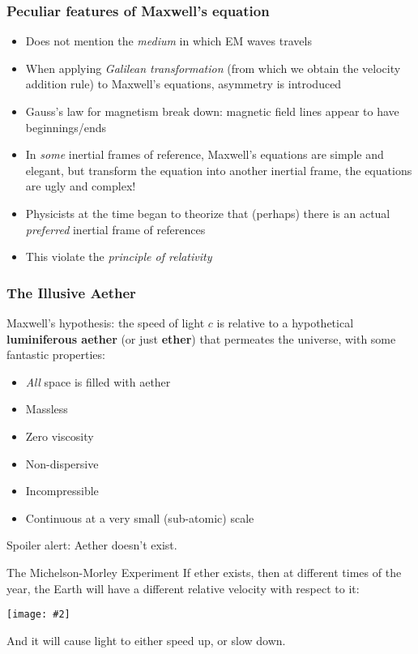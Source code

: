 \documentclass[12pt,compress,aspectratio=169]{beamer}
\newcommand{\pic}[2]{\texttt{[image: \#2]}}
\begin{document}
\begin{frame}
  \frametitle{Peculiar features of Maxwell's equation}
  \begin{itemize}
  \item Does not mention the \emph{medium} in which EM waves travels
  \item When applying \emph{Galilean transformation} (from which we obtain
    the velocity addition rule) to Maxwell's equations, asymmetry is introduced
  \item Gauss's law for magnetism break down: magnetic field lines appear to
    have beginnings/ends
  \item In \emph{some} inertial frames of reference, Maxwell's equations are
    simple and elegant, but transform the equation into another inertial frame,
    the equations are ugly and complex!
  \item Physicists at the time began to theorize that (perhaps) there is an
    actual \emph{preferred} inertial frame of references
  \item This violate the \emph{principle of relativity}
  \end{itemize}
\end{frame}


\begin{frame}
  \frametitle{The Illusive Aether}
  Maxwell's hypothesis: the speed of light $c$ is relative to a hypothetical
  \textbf{luminiferous aether} (or just \textbf{ether}) that permeates the
  universe, with some fantastic properties:
  \begin{itemize}
  \item \emph{All} space is filled with aether
  \item Massless
  \item Zero viscosity
  \item Non-dispersive
  \item Incompressible
  \item Continuous at a very small (sub-atomic) scale
  \end{itemize}
  Spoiler alert: Aether doesn't exist.
\end{frame}



\begin{frame}{The Michelson-Morley Experiment}
  If ether exists, then at different times of the year, the Earth will have a
  different relative velocity with respect to it:
  \begin{center}
    \pic{.4}{graphics/2000px-AetherWind.png}
  \end{center}
  And it will cause light to either speed up, or slow down.
\end{frame}
\end{document}
